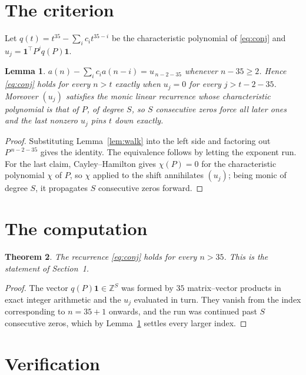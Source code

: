 \documentclass[11pt,a4paper]{article}
\theoremstyle{plain}
\newtheorem{theorem}{Theorem}
\newtheorem{lemma}[theorem]{Lemma}
\theoremstyle{definition}
\begin{document}
\section{The criterion}

Let $q(t)=t^{35}-\sum_i c_i t^{35-i}$ be the characteristic polynomial of
\eqref{eq:conj} and $u_j=\mathbf{1}^{\!\top}P^{j}q(P)\mathbf{1}$.

\begin{lemma}\label{lem:crit}
$a(n)-\sum_i c_i a(n-i)=u_{\,n-2-35}$ whenever $n-35\ge2$. Hence
\eqref{eq:conj} holds for every $n>t$ exactly when $u_j=0$ for every
$j>t-2-35$. Moreover $(u_j)$ satisfies the monic linear recurrence whose
characteristic polynomial is that of $P$, of degree $S$, so $S$ consecutive zeros force all
later ones and the last nonzero $u_j$ pins $t$ down exactly.
\end{lemma}

\begin{proof}
Substituting Lemma~\ref{lem:walk} into the left side and factoring out
$P^{\,n-2-35}$ gives the identity. The equivalence follows by letting the exponent
run. For the last claim, Cayley--Hamilton gives $\chi(P)=0$ for the characteristic
polynomial $\chi$ of $P$, so $\chi$ applied to the shift annihilates $(u_j)$; being monic of
degree $S$, it propagates $S$ consecutive zeros forward.
\end{proof}

\section{The computation}

\begin{theorem}
The recurrence \eqref{eq:conj} holds for every $n>35$. This is the statement of
Section~1.
\end{theorem}

\begin{proof}
The vector $q(P)\mathbf{1}\in\mathbb{Z}^{S}$ was formed by $35$ matrix--vector
products in exact integer arithmetic and the $u_j$ evaluated in turn. They vanish from the
index corresponding to $n=35+1$ onwards, and the run was continued past $S$ consecutive
zeros, which by Lemma~\ref{lem:crit} settles every larger index.
\end{proof}

\section{Verification}
\end{document}
